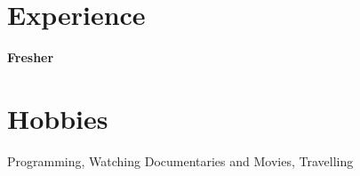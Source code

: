 \documentclass[line, margin]{res}
\begin{document}
\begin{resume}
\section{Experience} 
\textbf{Fresher}

\section{Hobbies}
Programming, Watching Documentaries and Movies, Travelling
 
\end{resume}
\end{document}
